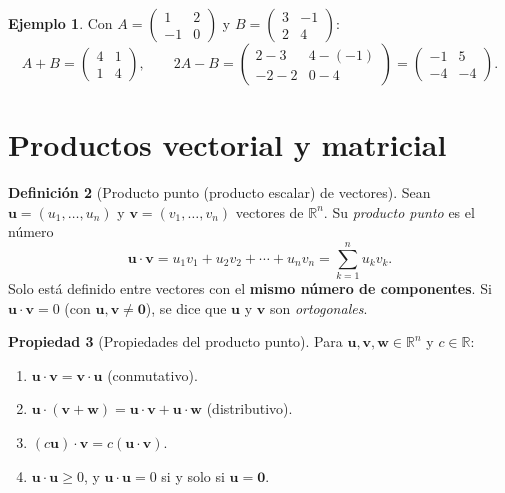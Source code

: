 \documentclass[11pt,letterpaper]{article}
\theoremstyle{definition}
\newtheorem{definicion}{Definición}[section]
\newtheorem{ejemplo}[definicion]{Ejemplo}
\newtheorem{propiedad}[definicion]{Propiedad}
\theoremstyle{plain}
\newcommand{\R}{\mathbb{R}}
\newcommand{\vv}[1]{\mathbf{#1}}
\begin{document}
\begin{ejemplo}
Con $A=\begin{pmatrix}1&2\\-1&0\end{pmatrix}$ y $B=\begin{pmatrix}3&-1\\2&4\end{pmatrix}$:
\[
  A+B = \begin{pmatrix}4&1\\1&4\end{pmatrix}, \qquad
  2A-B = \begin{pmatrix}2-3 & 4-(-1)\\-2-2 & 0-4\end{pmatrix} = \begin{pmatrix}-1&5\\-4&-4\end{pmatrix}.
\]
\end{ejemplo}

\section{Productos vectorial y matricial}

\begin{definicion}[Producto punto (producto escalar) de vectores]
Sean $\vv{u}=(u_1,\ldots,u_n)$ y $\vv{v}=(v_1,\ldots,v_n)$ vectores de $\R^n$. Su \emph{producto
punto} es el número
\[
  \vv{u}\cdot\vv{v} = u_1v_1 + u_2v_2 + \cdots + u_nv_n = \sum_{k=1}^n u_kv_k.
\]
Solo está definido entre vectores con el \textbf{mismo número de componentes}. Si
$\vv{u}\cdot\vv{v}=0$ (con $\vv{u},\vv{v}\neq\vv{0}$), se dice que $\vv{u}$ y $\vv{v}$ son
\emph{ortogonales}.
\end{definicion}

\begin{propiedad}[Propiedades del producto punto]
Para $\vv{u},\vv{v},\vv{w}\in\R^n$ y $c\in\R$:
\begin{enumerate}[label=(\roman*)]
  \item $\vv{u}\cdot\vv{v} = \vv{v}\cdot\vv{u}$ (conmutativo).
  \item $\vv{u}\cdot(\vv{v}+\vv{w}) = \vv{u}\cdot\vv{v}+\vv{u}\cdot\vv{w}$ (distributivo).
  \item $(c\vv{u})\cdot\vv{v} = c(\vv{u}\cdot\vv{v})$.
  \item $\vv{u}\cdot\vv{u}\geq 0$, y $\vv{u}\cdot\vv{u}=0$ si y solo si $\vv{u}=\vv{0}$.
\end{enumerate}
\end{propiedad}
\end{document}
